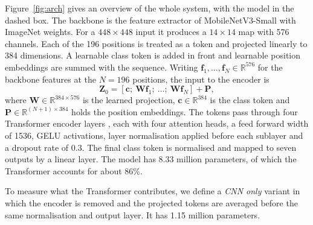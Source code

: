 \documentclass[runningheads]{llncs}
\begin{document}
Figure~\ref{fig:arch} gives an overview of the whole system, with the model in the dashed box. The backbone is the feature extractor of MobileNetV3-Small \cite{howard2019} with ImageNet weights. For a $448 \times 448$ input it produces a $14 \times 14$ map with 576 channels. Each of the 196 positions is treated as a token and projected linearly to 384 dimensions. A learnable class token is added in front and learnable position embeddings are summed with the sequence. Writing $\mathbf{f}_1, \dots, \mathbf{f}_N \in \mathbb{R}^{576}$ for the backbone features at the $N = 196$ positions, the input to the encoder is
\begin{equation}
\mathbf{Z}_0 = \left[\mathbf{c};\ \mathbf{W}\mathbf{f}_1;\ \dots;\ \mathbf{W}\mathbf{f}_N\right] + \mathbf{P},
\label{eq:tokens}
\end{equation}
where $\mathbf{W} \in \mathbb{R}^{384 \times 576}$ is the learned projection, $\mathbf{c} \in \mathbb{R}^{384}$ is the class token and $\mathbf{P} \in \mathbb{R}^{(N+1) \times 384}$ holds the position embeddings. The tokens pass through four Transformer encoder layers \cite{vaswani2017}, each with four attention heads, a feed forward width of 1536, GELU activations, layer normalisation applied before each sublayer and a dropout rate of 0.3. The final class token is normalised and mapped to seven outputs by a linear layer. The model has 8.33 million parameters, of which the Transformer accounts for about 86\%.

To measure what the Transformer contributes, we define a \emph{CNN only} variant in which the encoder is removed and the projected tokens are averaged before the same normalisation and output layer. It has 1.15 million parameters.
\end{document}
